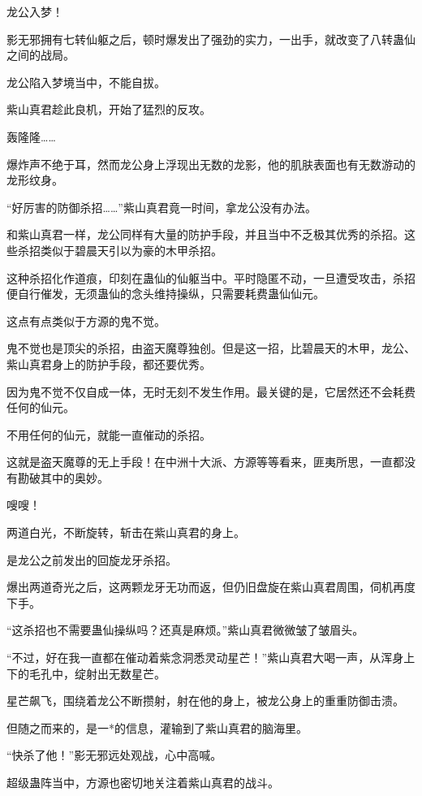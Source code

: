 
\begin{this_body}

龙公入梦！

影无邪拥有七转仙躯之后，顿时爆发出了强劲的实力，一出手，就改变了八转蛊仙之间的战局。

龙公陷入梦境当中，不能自拔。

紫山真君趁此良机，开始了猛烈的反攻。

轰隆隆……

爆炸声不绝于耳，然而龙公身上浮现出无数的龙影，他的肌肤表面也有无数游动的龙形纹身。

“好厉害的防御杀招……”紫山真君竟一时间，拿龙公没有办法。

和紫山真君一样，龙公同样有大量的防护手段，并且当中不乏极其优秀的杀招。这些杀招类似于碧晨天引以为豪的木甲杀招。

这种杀招化作道痕，印刻在蛊仙的仙躯当中。平时隐匿不动，一旦遭受攻击，杀招便自行催发，无须蛊仙的念头维持操纵，只需要耗费蛊仙仙元。

这点有点类似于方源的鬼不觉。

鬼不觉也是顶尖的杀招，由盗天魔尊独创。但是这一招，比碧晨天的木甲，龙公、紫山真君身上的防护手段，都还要优秀。

因为鬼不觉不仅自成一体，无时无刻不发生作用。最关键的是，它居然还不会耗费任何的仙元。

不用任何的仙元，就能一直催动的杀招。

这就是盗天魔尊的无上手段！在中洲十大派、方源等等看来，匪夷所思，一直都没有勘破其中的奥妙。

嗖嗖！

两道白光，不断旋转，斩击在紫山真君的身上。

是龙公之前发出的回旋龙牙杀招。

爆出两道奇光之后，这两颗龙牙无功而返，但仍旧盘旋在紫山真君周围，伺机再度下手。

“这杀招也不需要蛊仙操纵吗？还真是麻烦。”紫山真君微微皱了皱眉头。

“不过，好在我一直都在催动着紫念洞悉灵动星芒！”紫山真君大喝一声，从浑身上下的毛孔中，绽射出无数星芒。

星芒飙飞，围绕着龙公不断攒射，射在他的身上，被龙公身上的重重防御击溃。

但随之而来的，是一*的信息，灌输到了紫山真君的脑海里。

“快杀了他！”影无邪远处观战，心中高喊。

超级蛊阵当中，方源也密切地关注着紫山真君的战斗。


\end{this_body}
